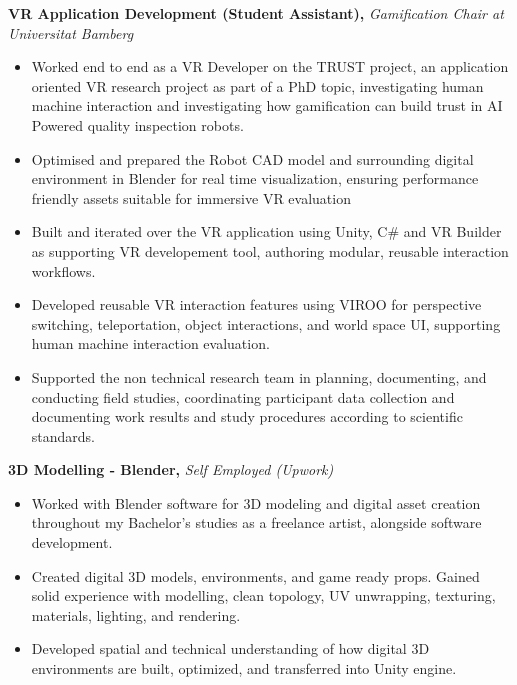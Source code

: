 \documentclass[10.5pt,a4paper]{article}
\begin{document}
\small\textbf{VR Application Development (Student Assistant),} \textit{Gamification Chair at Universitat Bamberg}
\begin{itemize}
  \small
  \item Worked end to end as a VR Developer on the TRUST project, an application oriented VR research project as part of a PhD topic, investigating human machine interaction and investigating how gamification can build trust in AI Powered quality inspection robots.
  \item Optimised and prepared the Robot CAD model and surrounding digital environment in Blender for real time visualization, ensuring performance friendly assets suitable for immersive VR evaluation
  \item Built and iterated over the VR application using Unity, C\# and VR Builder as supporting VR developement tool, authoring modular, reusable interaction workflows.
  \item Developed reusable VR interaction features using VIROO for perspective switching, teleportation, object interactions, and world space UI, supporting human machine interaction evaluation.
  \item Supported the non technical research team in planning, documenting, and conducting field studies, coordinating participant data collection and documenting work results and study procedures according to scientific standards.
\end{itemize}
\entryend

\small\textbf{3D Modelling - Blender,} \textit{Self Employed (Upwork)}
\begin{itemize}
  \small
  \item Worked with Blender software for 3D modeling and digital asset creation throughout my Bachelor's studies as a freelance artist, alongside software development.
  \item Created digital 3D models, environments, and game ready props. Gained solid experience with modelling, clean topology, UV unwrapping, texturing, materials, lighting, and rendering.
  \item Developed spatial and technical understanding of how digital 3D environments are built, optimized, and transferred into Unity engine.
\end{itemize}
\entryend

\end{document}
